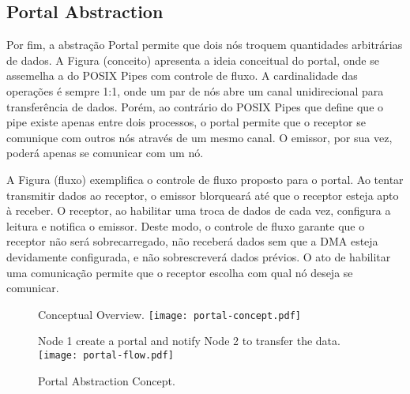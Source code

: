 		\subsection{Portal Abstraction}
		\label{sec.portal-abs}


			Por fim, a abstração Portal permite que dois nós troquem quantidades arbitrárias de dados.
			A Figura (conceito) apresenta a ideia conceitual do portal, onde se assemelha a do POSIX Pipes com controle de fluxo.
			A cardinalidade das operações é sempre 1:1, onde um par de nós abre um canal unidirecional para transferência de dados.
			Porém, ao contrário do POSIX Pipes que define que o pipe existe apenas entre dois processos, o portal permite que o receptor se comunique com outros nós através de um mesmo canal.
			O emissor, por sua vez, poderá apenas se comunicar com um nó.

			A Figura (fluxo) exemplifica o controle de fluxo proposto para o portal.
			Ao tentar transmitir dados ao receptor, o emissor blorqueará até que o receptor esteja apto à receber.
			O receptor, ao habilitar uma troca de dados de cada vez, configura a leitura e notifica o emissor.
			Deste modo, o controle de fluxo garante que o receptor não será sobrecarregado, não receberá dados sem que a DMA esteja devidamente configurada, e não sobrescreverá dados prévios.
			O ato de habilitar uma comunicação permite que o receptor escolha com qual nó deseja se comunicar.


			\begin{figure}[!tb]
				\centering%
				\caption{Portal Abstraction Concept.}%
				\label{fig:portal}%

					{Conceptual Overview.}%
					{\texttt{[image: portal-concept.pdf]}}%

				\hfill

					{Node 1 create a portal and notify Node 2 to transfer the data.}%
					{\texttt{[image: portal-flow.pdf]}}%

			\end{figure}

